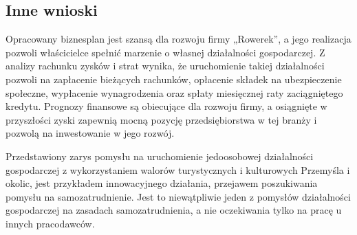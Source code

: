 \documentclass{sprawozdanie-agh}
\begin{document}
		\subsection{Inne wnioski}
		
		Opracowany biznesplan jest szansą dla rozwoju firmy „Rowerek”, a jego realizacja pozwoli właścicielce spełnić marzenie o własnej działalności gospodarczej. Z analizy rachunku zysków i strat wynika, że uruchomienie takiej działalności pozwoli na zapłacenie bieżących rachunków, opłacenie składek na ubezpieczenie społeczne, wypłacenie wynagrodzenia oraz spłaty miesięcznej raty zaciągniętego kredytu. Prognozy finansowe są obiecujące dla rozwoju firmy, a osiągnięte w przyszłości zyski zapewnią mocną pozycję przedsiębiorstwa w tej branży i pozwolą na inwestowanie w jego rozwój.
		
		Przedstawiony zarys pomysłu na uruchomienie jedoosobowej działalności gospodarczej z wykorzystaniem walorów turystycznych i kulturowych Przemyśla i okolic, jest przykładem innowacyjnego działania, przejawem poszukiwania pomysłu na samozatrudnienie. Jest to niewątpliwie jeden z pomysłów działalności gospodarczej na zasadach samozatrudnienia, a nie oczekiwania tylko na pracę u innych pracodawców.
\end{document}

